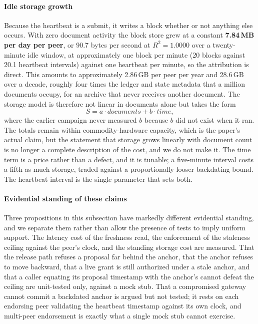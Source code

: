 \documentclass[preprint,12pt]{elsarticle}
\begin{document}
\paragraph{Idle storage growth}
Because the heartbeat is a submit, it writes a block whether or not anything
else occurs. With zero document activity the block store grew at a constant
\textbf{7.84\,MB per day per peer}, or 90.7 bytes per second at
$R^2 = 1.0000$ over a twenty-minute idle window, at approximately one block
per minute (20 blocks against 20.1 heartbeat intervals) against one heartbeat
per minute, so the attribution is direct. This amounts to approximately
2.86\,GB per peer per year and 28.6\,GB over a decade, roughly four times
the ledger and state metadata that a million documents occupy, for an archive
that never receives another document. The storage model is
therefore not linear in documents alone but takes the form
\begin{equation}
  S = a \cdot \mathit{documents} + b \cdot \mathit{time},
  \label{eq:storage_model}
\end{equation}
where the earlier campaign never measured $b$ because $b$ did not exist when
it ran. The totals remain within commodity-hardware capacity, which is the
paper's actual claim, but the statement that storage grows linearly with
document count is no longer a complete description of the cost, and we do not
make it. The time term is a price rather than a defect, and it is tunable; a
five-minute interval costs a fifth as much storage, traded against a
proportionally looser backdating bound. The heartbeat interval is the single
parameter that sets both.

\paragraph{Evidential standing of these claims}
Three propositions in this subsection have markedly different evidential
standing, and we separate them rather than allow the presence of tests to
imply uniform support. The latency cost of the freshness read, the enforcement
of the staleness ceiling against the peer's clock, and the standing storage
cost are measured. That the release path refuses a proposal far behind the
anchor, that the anchor refuses to move backward, that a live grant is still
authorized under a stale anchor, and that a caller equating its proposal
timestamp with the anchor's cannot defeat the ceiling are unit-tested only,
against a mock stub. That a compromised gateway cannot commit a backdated
anchor is argued but not tested; it rests on each endorsing peer validating
the heartbeat timestamp against its own clock, and multi-peer endorsement is
exactly what a single mock stub cannot exercise.
\end{document}

